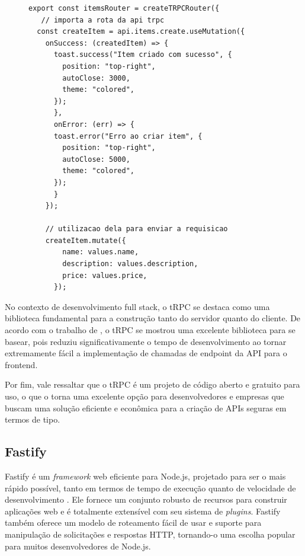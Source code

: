 \begin{figure}[h]
\begin{lstlisting}[caption={Exemplo de uso da biblioteca tRPC no frontend.}, label={code:trpc2}]
export const itemsRouter = createTRPCRouter({
   // importa a rota da api trpc
  const createItem = api.items.create.useMutation({
    onSuccess: (createdItem) => {
      toast.success("Item criado com sucesso", {
        position: "top-right",
        autoClose: 3000,
        theme: "colored",
      });
      },
      onError: (err) => {
      toast.error("Erro ao criar item", {
        position: "top-right",
        autoClose: 5000,
        theme: "colored",
      });
      }
    });

    // utilizacao dela para enviar a requisicao
    createItem.mutate({
        name: values.name,
        description: values.description,
        price: values.price,
      });
\end{lstlisting}
\end{figure}

No contexto de desenvolvimento full stack, o tRPC se destaca como uma biblioteca fundamental para a construção tanto do servidor quanto do cliente. De acordo com o trabalho de \cite{Nivasalo2022}, o tRPC se mostrou uma excelente biblioteca para se basear, pois reduziu significativamente o tempo de desenvolvimento ao tornar extremamente fácil a implementação de chamadas de endpoint da API para o frontend.

Por fim, vale ressaltar que o tRPC é um projeto de código aberto e gratuito para uso, o que o torna uma excelente opção para desenvolvedores e empresas que buscam uma solução eficiente e econômica para a criação de APIs seguras em termos de tipo.

\subsection{Fastify}

Fastify é um \textit{framework} web eficiente para Node.js, projetado para ser o mais rápido possível, tanto em termos de tempo de execução quanto de velocidade de desenvolvimento \cite{fastify}. Ele fornece um conjunto robusto de recursos para construir aplicações web e é totalmente extensível com seu sistema de \textit{plugins}. Fastify também oferece um modelo de roteamento fácil de usar e suporte para manipulação de solicitações e respostas HTTP, tornando-o uma escolha popular para muitos desenvolvedores de Node.js.

